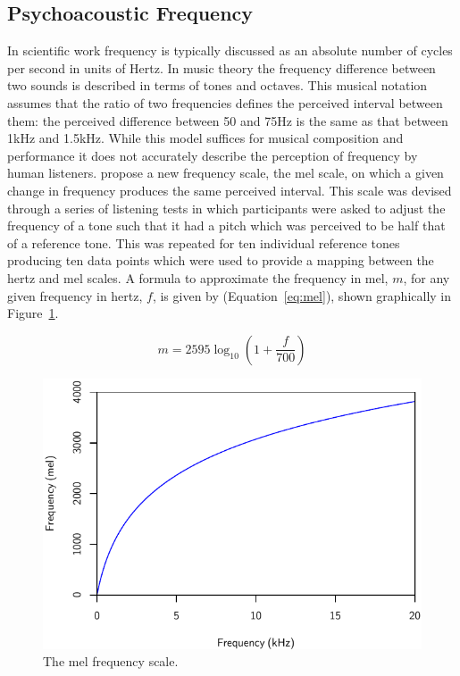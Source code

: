 	\subsection{Psychoacoustic Frequency}
	\label{sec:Timbre-PsychoacousticPrinciples-Frequency}
		In scientific work frequency is typically discussed as an absolute number of cycles per second in units of
		Hertz. In music theory the frequency difference between two sounds is described in terms of tones and
		octaves.  This musical notation assumes that the ratio of two frequencies defines the perceived interval
		between them: the perceived difference between 50 and 75Hz is the same as that between 1kHz and 1.5kHz.
		While this model suffices for musical composition and performance it does not accurately describe the
		perception of frequency by human listeners. \citet{stevens1937a} propose a new frequency scale, the mel
		scale, on which a given change in frequency produces the same perceived interval. This scale was devised
		through a series of listening tests in which participants were asked to adjust the frequency of a tone such
		that it had a pitch which was perceived to be half that of a reference tone. This was repeated for ten
		individual reference tones producing ten data points which were used to provide a mapping between the hertz
		and mel scales. A formula to approximate the frequency in mel, $m$, for any given frequency in hertz, $f$,
		is given by \citet{oshaughnessy2000speech} (Equation~\ref{eq:mel}), shown graphically in
		Figure~\ref{fig:MelScale}.

		\begin{equation}
			m = 2595 \log_{10} \left(1 + \frac{f}{700} \right)
			\label{eq:mel}
		\end{equation}

		\begin{figure}[h!]
			\centering
			\includegraphics{chapter2/Images/MelScale.pdf}
			\caption{The mel frequency scale.}
			\label{fig:MelScale}
		\end{figure}

